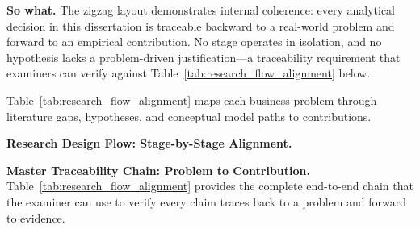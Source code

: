 \noindent\textbf{So what.} The zigzag layout demonstrates internal coherence: every analytical decision in this dissertation is traceable backward to a real-world problem and forward to an empirical contribution. No stage operates in isolation, and no hypothesis lacks a problem-driven justification---a traceability requirement that examiners can verify against Table~\ref{tab:research_flow_alignment} below.
\fi

Table~\ref{tab:research_flow_alignment} maps each business problem through literature gaps, hypotheses, and conceptual model paths to contributions.


\noindent\textbf{Research Design Flow: Stage-by-Stage Alignment.}

\noindent\textbf{Master Traceability Chain: Problem to Contribution.} Table~\ref{tab:research_flow_alignment} provides the complete end-to-end chain that the examiner can use to verify every claim traces back to a problem and forward to evidence.

